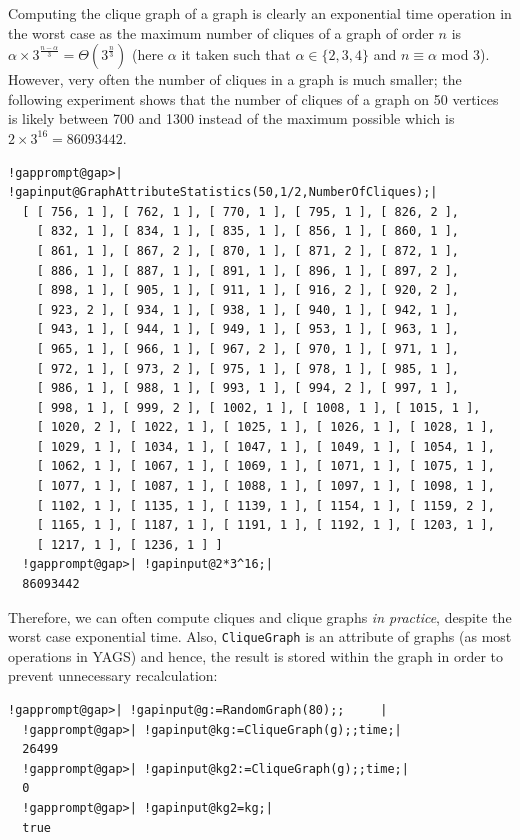 \documentclass[a4paper,11pt]{report}
\begin{document}
{{Computing the clique graph of a graph is clearly an exponential time operation
in the worst case as the maximum number of cliques of a graph of order $n$ is $\alpha\times 3^{\frac{n-\alpha}{3}}= \Theta(3^{\frac{n}{3}})$ \cite{MM65} (here $\alpha$ it taken such that $\alpha \in \{2,3,4\}$ and $n\equiv \alpha$ mod 3). However, very often the number of cliques in a graph is much smaller; the
following experiment shows that the number of cliques of a graph on 50
vertices is likely between 700 and 1300 instead of the maximum possible which
is $2\times3^{16}=86093442$. 

 
\begin{Verbatim}[commandchars=!@|,fontsize=\small,frame=single,label=Example]
  !gapprompt@gap>| !gapinput@GraphAttributeStatistics(50,1/2,NumberOfCliques);|
  [ [ 756, 1 ], [ 762, 1 ], [ 770, 1 ], [ 795, 1 ], [ 826, 2 ], 
    [ 832, 1 ], [ 834, 1 ], [ 835, 1 ], [ 856, 1 ], [ 860, 1 ], 
    [ 861, 1 ], [ 867, 2 ], [ 870, 1 ], [ 871, 2 ], [ 872, 1 ], 
    [ 886, 1 ], [ 887, 1 ], [ 891, 1 ], [ 896, 1 ], [ 897, 2 ], 
    [ 898, 1 ], [ 905, 1 ], [ 911, 1 ], [ 916, 2 ], [ 920, 2 ], 
    [ 923, 2 ], [ 934, 1 ], [ 938, 1 ], [ 940, 1 ], [ 942, 1 ], 
    [ 943, 1 ], [ 944, 1 ], [ 949, 1 ], [ 953, 1 ], [ 963, 1 ], 
    [ 965, 1 ], [ 966, 1 ], [ 967, 2 ], [ 970, 1 ], [ 971, 1 ], 
    [ 972, 1 ], [ 973, 2 ], [ 975, 1 ], [ 978, 1 ], [ 985, 1 ], 
    [ 986, 1 ], [ 988, 1 ], [ 993, 1 ], [ 994, 2 ], [ 997, 1 ], 
    [ 998, 1 ], [ 999, 2 ], [ 1002, 1 ], [ 1008, 1 ], [ 1015, 1 ], 
    [ 1020, 2 ], [ 1022, 1 ], [ 1025, 1 ], [ 1026, 1 ], [ 1028, 1 ], 
    [ 1029, 1 ], [ 1034, 1 ], [ 1047, 1 ], [ 1049, 1 ], [ 1054, 1 ], 
    [ 1062, 1 ], [ 1067, 1 ], [ 1069, 1 ], [ 1071, 1 ], [ 1075, 1 ], 
    [ 1077, 1 ], [ 1087, 1 ], [ 1088, 1 ], [ 1097, 1 ], [ 1098, 1 ], 
    [ 1102, 1 ], [ 1135, 1 ], [ 1139, 1 ], [ 1154, 1 ], [ 1159, 2 ], 
    [ 1165, 1 ], [ 1187, 1 ], [ 1191, 1 ], [ 1192, 1 ], [ 1203, 1 ], 
    [ 1217, 1 ], [ 1236, 1 ] ]
  !gapprompt@gap>| !gapinput@2*3^16;|
  86093442
\end{Verbatim}
 

Therefore, we can often compute cliques and clique graphs \emph{in practice}, despite the worst case exponential time. Also, \texttt{CliqueGraph} is an attribute of graphs (as most operations in \textsf{YAGS}) and hence, the result is stored within the graph in order to prevent
unnecessary recalculation: 

 
\begin{Verbatim}[commandchars=!@|,fontsize=\small,frame=single,label=Example]
  !gapprompt@gap>| !gapinput@g:=RandomGraph(80);;     |
  !gapprompt@gap>| !gapinput@kg:=CliqueGraph(g);;time;|
  26499
  !gapprompt@gap>| !gapinput@kg2:=CliqueGraph(g);;time;|
  0
  !gapprompt@gap>| !gapinput@kg2=kg;|
  true
\end{Verbatim}
 

}}
\end{document}
